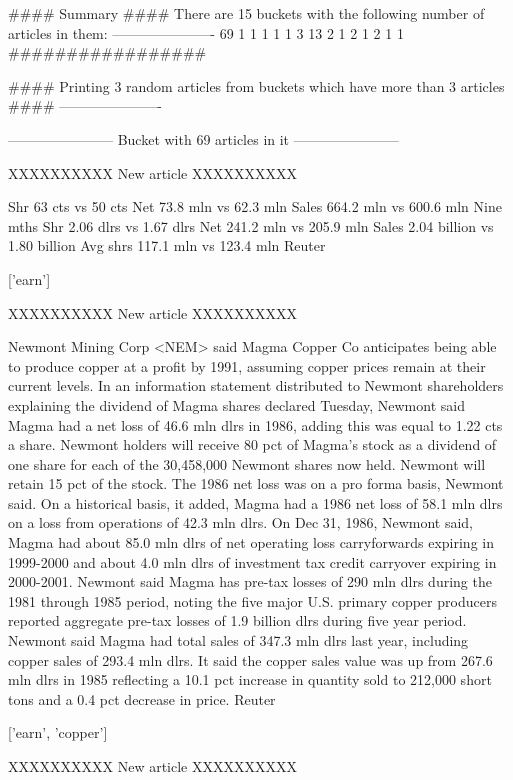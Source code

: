 \documentclass{article}
\begin{document}
\begin{pythonOutput}
#### Summary ####
There are 15 buckets with the following number of articles in them:
----------------------
69
1
1
1
1
1
3
13
2
1
2
1
2
1
1
#################

#### Printing 3 random articles from buckets which have more than 3 articles ####
----------------------

-----------------------
Bucket with 69 articles in it
-----------------------


XXXXXXXXXX
New article
XXXXXXXXXX

Shr 63 cts vs 50 cts
    Net 73.8 mln vs 62.3 mln
    Sales 664.2 mln vs 600.6 mln
    Nine mths
    Shr 2.06 dlrs vs 1.67 dlrs
    Net 241.2 mln vs 205.9 mln
    Sales 2.04 billion vs 1.80 billion
    Avg shrs 117.1 mln vs 123.4 mln
 Reuter

['earn']

XXXXXXXXXX
New article
XXXXXXXXXX

Newmont Mining Corp <NEM> said Magma
Copper Co anticipates being able to produce copper at a profit
by 1991, assuming copper prices remain at their current levels.
    In an information statement distributed to Newmont
shareholders explaining the dividend of Magma shares declared
Tuesday, Newmont said Magma had a net loss of 46.6 mln dlrs in
1986, adding this was equal to 1.22 cts a share.
    Newmont holders will receive 80 pct of Magma's stock as a
dividend of one share for each of the 30,458,000 Newmont shares
now held. Newmont will retain 15 pct of the stock.
    The 1986 net loss was on a pro forma basis, Newmont said.
On a historical basis, it added, Magma had a 1986 net loss of
58.1 mln dlrs on a loss from operations of 42.3 mln dlrs.
    On Dec 31, 1986, Newmont said, Magma had about 85.0 mln
dlrs of net operating loss carryforwards expiring in 1999-2000
and about 4.0 mln dlrs of investment tax credit carryover
expiring in 2000-2001.
    Newmont said Magma has pre-tax losses of 290 mln dlrs
during the 1981 through 1985 period, noting the five major U.S.
primary copper producers reported aggregate pre-tax losses of
1.9 billion dlrs during five year period.
    Newmont said Magma had total sales of 347.3 mln dlrs last
year, including copper sales of 293.4 mln dlrs.
    It said the copper sales value was up from 267.6 mln dlrs
in 1985 reflecting a 10.1 pct increase in quantity sold to
212,000 short tons and a 0.4 pct decrease in price.
 Reuter

['earn', 'copper']

XXXXXXXXXX
New article
XXXXXXXXXX


\end{pythonOutput}
\end{document}
